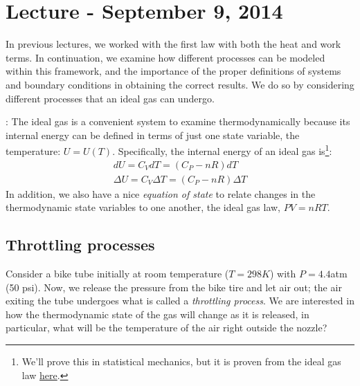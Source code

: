 \documentclass[12pt]{article}
\begin{document}
\section{Lecture - September 9, 2014}
In previous lectures, we worked with the first law with both the heat and work terms.  In continuation, we examine how different processes can be modeled within this framework, and the importance of the proper definitions of systems and boundary conditions in obtaining the correct results. We do so by considering different processes that an ideal gas can undergo.

:  The ideal gas is a convenient system to examine thermodynamically because its internal energy can be defined in terms of just one state variable, the temperature: $U = U(T)$. Specifically, the internal energy of an ideal gas is\footnote{We'll prove this in statistical mechanics, but it is proven from the ideal gas law \href{http://pruffle.mit.edu/3.00/Lecture_11_web/node1.html}{here}.}:
\begin{align*}
dU=C_V dT=(C_P-nR)dT\\
\Delta U=C_V \Delta T = (C_P-nR) \Delta T
\end{align*}
In addition, we also have a nice \emph{equation of state} to relate changes in the thermodynamic state variables to one another, the ideal gas law, $PV=nRT$.

\subsection{Throttling processes}

 Consider a bike tube initially at room temperature ($T=298K$) with $P=4.4$atm (50 psi).  Now, we release the pressure from the bike tire and let air out; the air exiting the tube undergoes what is called a \emph{throttling process}. We are interested in how the thermodynamic state of the gas will change as it is released, in particular, what will be the temperature of the air right outside the nozzle?\\
\end{document}

